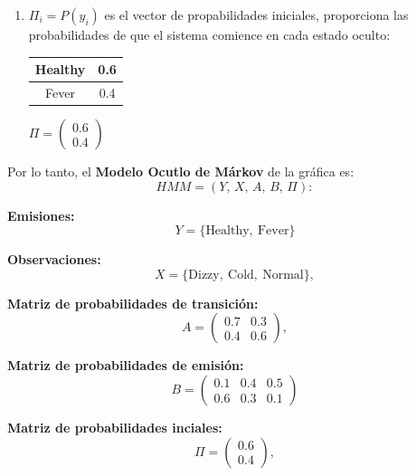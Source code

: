 \begin{enumerate}
\item $\Pi_i = P(y_i)$ es el vector de propabilidades iniciales, proporciona las probabilidades de que el sistema comience en cada estado oculto:

    \begin{center}
    \begin{tabular}{|c|c|}
      \hline
      Healthy & 0.6\\
      \hline
      Fever  & 0.4\\
      \hline
    \end{tabular}
    \qquad
    $\Pi = \begin{pmatrix} 0.6 \\ 0.4 \end{pmatrix}$
    \end{center}
\end{enumerate}

Por lo tanto, el \textbf{Modelo Ocutlo de Márkov} de la gráfica es:
\[
HMM = (Y,\, X,\, A,\, B,\, \Pi):
\]

\textbf{Emisiones:}
\[
Y = \{\text{Healthy},\ \text{Fever}\}
\]

\textbf{Observaciones:}
\[
X = \{\text{Dizzy},\ \text{Cold},\ \text{Normal}\},
\]

\textbf{Matriz de probabilidades de transición:}
\[
A = \begin{pmatrix} 0.7 & 0.3 \\ 0.4 & 0.6 \end{pmatrix},
\]

\textbf{Matriz de probabilidades de emisión:}
\[
B = \begin{pmatrix} 0.1 & 0.4 & 0.5 \\ 0.6 & 0.3 & 0.1 \end{pmatrix}
\]

\textbf{Matriz de probabilidades inciales:}
\[
\Pi = \begin{pmatrix} 0.6 \\ 0.4 \end{pmatrix},
\]
